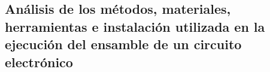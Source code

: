     
    




    
    


\subsection{Análisis de los métodos, materiales, herramientas e instalación utilizada en la ejecución del ensamble de un circuito electrónico}

